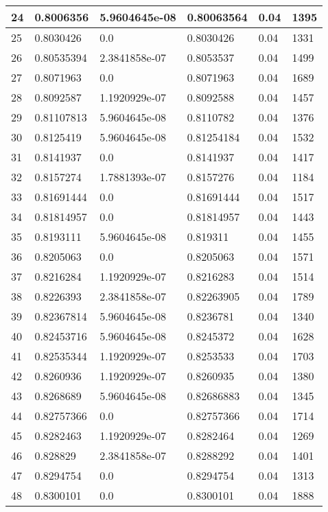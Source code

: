 \begin{longtable}{|l|l|l|l|l|l|}
24 & 0.8006356 & 5.9604645e-08 & 0.80063564 & 0.04 & 1395 \\ \hline 
25 & 0.8030426 & 0.0 & 0.8030426 & 0.04 & 1331 \\ \hline 
26 & 0.80535394 & 2.3841858e-07 & 0.8053537 & 0.04 & 1499 \\ \hline 
27 & 0.8071963 & 0.0 & 0.8071963 & 0.04 & 1689 \\ \hline 
28 & 0.8092587 & 1.1920929e-07 & 0.8092588 & 0.04 & 1457 \\ \hline 
29 & 0.81107813 & 5.9604645e-08 & 0.8110782 & 0.04 & 1376 \\ \hline 
30 & 0.8125419 & 5.9604645e-08 & 0.81254184 & 0.04 & 1532 \\ \hline 
31 & 0.8141937 & 0.0 & 0.8141937 & 0.04 & 1417 \\ \hline 
32 & 0.8157274 & 1.7881393e-07 & 0.8157276 & 0.04 & 1184 \\ \hline 
33 & 0.81691444 & 0.0 & 0.81691444 & 0.04 & 1517 \\ \hline 
34 & 0.81814957 & 0.0 & 0.81814957 & 0.04 & 1443 \\ \hline 
35 & 0.8193111 & 5.9604645e-08 & 0.819311 & 0.04 & 1455 \\ \hline 
36 & 0.8205063 & 0.0 & 0.8205063 & 0.04 & 1571 \\ \hline 
37 & 0.8216284 & 1.1920929e-07 & 0.8216283 & 0.04 & 1514 \\ \hline 
38 & 0.8226393 & 2.3841858e-07 & 0.82263905 & 0.04 & 1789 \\ \hline 
39 & 0.82367814 & 5.9604645e-08 & 0.8236781 & 0.04 & 1340 \\ \hline 
40 & 0.82453716 & 5.9604645e-08 & 0.8245372 & 0.04 & 1628 \\ \hline 
41 & 0.82535344 & 1.1920929e-07 & 0.8253533 & 0.04 & 1703 \\ \hline 
42 & 0.8260936 & 1.1920929e-07 & 0.8260935 & 0.04 & 1380 \\ \hline 
43 & 0.8268689 & 5.9604645e-08 & 0.82686883 & 0.04 & 1345 \\ \hline 
44 & 0.82757366 & 0.0 & 0.82757366 & 0.04 & 1714 \\ \hline 
45 & 0.8282463 & 1.1920929e-07 & 0.8282464 & 0.04 & 1269 \\ \hline 
46 & 0.828829 & 2.3841858e-07 & 0.8288292 & 0.04 & 1401 \\ \hline 
47 & 0.8294754 & 0.0 & 0.8294754 & 0.04 & 1313 \\ \hline 
48 & 0.8300101 & 0.0 & 0.8300101 & 0.04 & 1888 \\ \hline 

\end{longtable}
